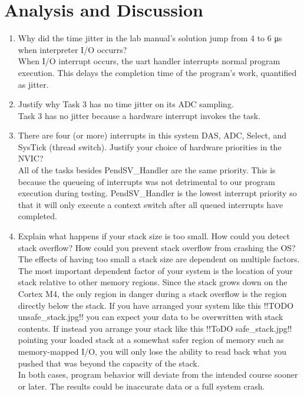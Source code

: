 \documentclass[12pt]{article}
\begin{document}
\section{Analysis and Discussion}
\begin{enumerate}[1)]
\item Why did the time jitter in the lab manual's solution jump from 4
  to 6 μs when interpreter I/O occurrs? \\
  When I/O interrupt occurs, the uart handler interrupts normal
  program execution. This delays the completion time of the program's
  work, quantified as jitter.
\item Justify why Task 3 has no time jitter on its ADC sampling. \\
  Task 3 has no jitter because a hardware interrupt invokes the task.
\item There are four (or more) interrupts in this system DAS, ADC,
  Select, and SysTick (thread switch). Justify your choice of hardware
  priorities in the NVIC? \\
  All of the tasks besides PendSV_Handler are the same priority. This
  is because the queueing of interrupts was not detrimental to our
  program execution during testing. PendSV_Handler is the lowest
  interrupt priority so that it will only execute a context switch
  after all queued interrupts have completed.
\item Explain what happens if your stack size is too small. How could
  you detect stack overflow? How could you prevent stack overflow from
  crashing the OS? \\
  The effects of having too small a stack size are dependent on
  multiple factors. The most important dependent factor of your system
  is the location of your stack relative to other memory
  regions. Since the stack grows down on the Cortex M4, the only
  region in danger during a stack overflow is the region directly
  below the stack. If you have arranged your system like this !!TODO
  unsafe_stack.jpg!! you can expect your data to be overwritten with
  stack contents. If instead you arrange your stack like this !!ToDO
  safe_stack.jpg!! pointing your loaded stack at a somewhat safer
  region of memory such as memory-mapped I/O, you will only lose the
  ability to read back what you pushed that was beyond the
  capacity of the stack. \\
  In both cases, program behavior will deviate from the intended
  course sooner or later. The results could be inaccurate data or a
  full system crash. \\

\end{enumerate}
\end{document}
